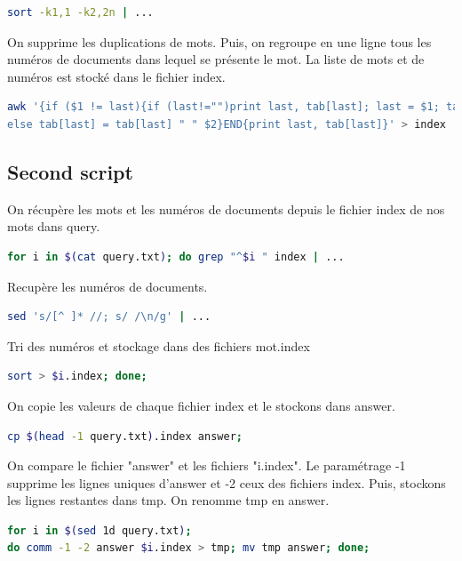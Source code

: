 \documentclass{article}
\begin{document}
\begin{lstlisting}[language=bash,caption={Requête 2}]
sort -k1,1 -k2,2n | ...
\end{lstlisting}

On supprime les duplications de mots. Puis, on regroupe en une ligne tous les numéros de documents dans lequel se présente le mot.
La liste de mots et de numéros est stocké dans le fichier index.

\begin{lstlisting}[language=bash,caption={Requête 3}]
awk '{if ($1 != last){if (last!="")print last, tab[last]; last = $1; tab[last] = $2} 
else tab[last] = tab[last] " " $2}END{print last, tab[last]}' > index
\end{lstlisting}


\subsection{Second script}

On récupère les mots et les numéros de documents depuis le fichier index de nos mots dans query.
\begin{lstlisting}[language=bash,caption={Requete 1}]
for i in $(cat query.txt); do grep "^$i " index | ...
\end{lstlisting}

Recupère les numéros de documents.

\begin{lstlisting}[language=bash,caption={Requête 2}]
sed 's/[^ ]* //; s/ /\n/g' | ...
\end{lstlisting}

Tri des numéros et stockage dans des fichiers mot.index
\begin{lstlisting}[language=bash,caption={Requête 3}]
sort > $i.index; done;
\end{lstlisting}

On copie les valeurs de chaque fichier index et le stockons dans answer.

\begin{lstlisting}[language=bash,caption={Requête 4}]
cp $(head -1 query.txt).index answer;
\end{lstlisting}

On compare le fichier "answer" et les fichiers "i.index". Le paramétrage -1 supprime les lignes uniques d'answer et -2 ceux des fichiers index. Puis, stockons les lignes restantes dans tmp. On renomme tmp en answer.

\begin{lstlisting}[language=bash,caption={Requête 5}]
for i in $(sed 1d query.txt); 
do comm -1 -2 answer $i.index > tmp; mv tmp answer; done;
\end{lstlisting}
\end{document}
